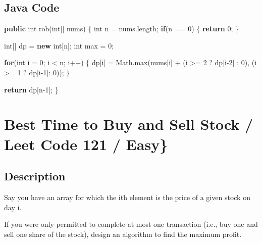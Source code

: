 \documentclass[]{book}
\newenvironment{Shaded}{\begin{snugshade}}{\end{snugshade}}
\newcommand{\BuiltInTok}[1]{#1}
\newcommand{\DataTypeTok}[1]{\textcolor[rgb]{0.13,0.29,0.53}{#1}}
\newcommand{\DecValTok}[1]{\textcolor[rgb]{0.00,0.00,0.81}{#1}}
\newcommand{\FunctionTok}[1]{\textcolor[rgb]{0.00,0.00,0.00}{#1}}
\newcommand{\KeywordTok}[1]{\textcolor[rgb]{0.13,0.29,0.53}{\textbf{#1}}}
\newcommand{\NormalTok}[1]{#1}
\begin{document}
\hypertarget{java-code-29}{%
\subsection{Java Code}\label{java-code-29}}

\begin{Shaded}
\begin{Highlighting}[]
\KeywordTok{public} \DataTypeTok{int} \FunctionTok{rob}\NormalTok{(}\DataTypeTok{int}\NormalTok{[] nums) \{}
    \DataTypeTok{int}\NormalTok{ n = nums.}\FunctionTok{length}\NormalTok{;}
    \KeywordTok{if}\NormalTok{(n == }\DecValTok{0}\NormalTok{) \{}
        \KeywordTok{return} \DecValTok{0}\NormalTok{;}
\NormalTok{    \}}

    \DataTypeTok{int}\NormalTok{[] dp = }\KeywordTok{new} \DataTypeTok{int}\NormalTok{[n];}
    \DataTypeTok{int}\NormalTok{ max = }\DecValTok{0}\NormalTok{;}

    \KeywordTok{for}\NormalTok{(}\DataTypeTok{int}\NormalTok{ i = }\DecValTok{0}\NormalTok{; i < n; i++) \{}
\NormalTok{        dp[i] = }\BuiltInTok{Math}\NormalTok{.}\FunctionTok{max}\NormalTok{(nums[i] + (i >= }\DecValTok{2}\NormalTok{ ? dp[i}\DecValTok{-2}\NormalTok{] : }\DecValTok{0}\NormalTok{), (i >= }\DecValTok{1}\NormalTok{ ? dp[i}\DecValTok{-1}\NormalTok{]: }\DecValTok{0}\NormalTok{));}
\NormalTok{    \}}

    \KeywordTok{return}\NormalTok{ dp[n}\DecValTok{-1}\NormalTok{];}
\NormalTok{\}}
\end{Highlighting}
\end{Shaded}

\hypertarget{best-time-to-buy-and-sell-stock-leet-code-121-easy}{%
\section{Best Time to Buy and Sell Stock / Leet Code 121 / Easy\}}\label{best-time-to-buy-and-sell-stock-leet-code-121-easy}}

\hypertarget{description-34}{%
\subsection{Description}\label{description-34}}

Say you have an array for which the ith element is the price of a given stock on day i.

If you were only permitted to complete at most one transaction (i.e., buy one and sell one share of the stock),
design an algorithm to find the maximum profit.
\end{document}
